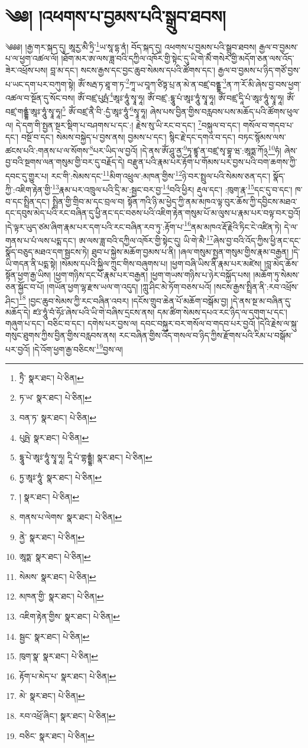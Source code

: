 \setcounter{footnote}{0} 
\chapter{༄༅། །འཕགས་པ་བྱམས་པའི་སྒྲུབ་ཐབས།}༄༅༅། །རྒྱ་གར་སྐད་དུ། ཨཱརྱ་མཻ་ཏྲི་\footnote{ཏྲཻ་  སྣར་ཐང་།  པེ་ཅིན། }ཡ་སཱ་དྷ་ནཾ། བོད་སྐད་དུ། འཕགས་པ་བྱམས་པའི་སྒྲུབ་ཐབས། རྒྱལ་བ་བྱམས་པ་ལ་ཕྱག་འཚལ་ལོ། །ཐོག་མར་ཨ་ལས་ཟླ་བའི་དཀྱིལ་འཁོར་གྱི་སྟེང་དུ་ཡི་གེ་མཻཾ་གསེར་གྱི་མདོག་ཅན་ལས་འོད་ཟེར་འཕྲོས་པས། བླ་མ་དང་། སངས་རྒྱས་དང་བྱང་ཆུབ་སེམས་དཔའི་ཚོགས་དང་། རྒྱལ་བ་བྱམས་པ་ཉིད་གཙོ་བྱས་པ་ཡང་དག་པར་བཀུག་སྟེ། ཨོཾ་སརྦ་ཏ་ཐཱ་ག་ཏ་\footnote{ཏ་ཡ་  སྣར་ཐང་།  པེ་ཅིན། }ཀཱ་ཡ་བཱཀ་ཙིཏྟ་པྲ་ན་མེ་ན་བཛྲ་བནྡྷ་\footnote{བན་ཏ་  སྣར་ཐང་།  པེ་ཅིན། }ན་ཀ་རོ་མི་ཞེས་བྱ་བས་ཕྱག་འཚལ་བ་སྔོན་དུ་སོང་བས། ཨོཾ་བཛྲ་པུཥྤཾ་\footnote{པུཥྤེ་  སྣར་ཐང་།  པེ་ཅིན། }ཨཱཿ་ཧཱུཾ་སྭཱ་ཧཱ། ཨོཾ་བཛྲ་:དྷཱུ་པཾ་ཨཱཿ་ཧཱུཾ་སྭཱ་ཧཱ། ཨོཾ་བཛྲ་དཱི་པཾ་ཨཱཿ་ཧཱུཾ་སྭཱ་ཧཱ། ཨོཾ་བཛྲ་གནྡྷཾ་ཨཱཿ་ཧཱུཾ་སྭཱ་ཧཱ།\footnote{དྷཱུ་པེ་ཨཱཿ་ཧཱུཾ་སྭཱ་ཧཱ། དཱི་པཾ་གྷནྡྷཾ།  སྣར་ཐང་།  པེ་ཅིན། } ཨོཾ་བཛྲ་ནཻ་བི་:དྱཾ་ཨཱཿ་ཧཱུཾ་\footnote{ཏྱ་ཨཱཿ་ཧཱུཾ་  སྣར་ཐང་།  པེ་ཅིན། }སྭཱ་ཧཱ། ཞེས་པས་བྱིན་གྱིས་བརླབས་པས་མཆོད་པའི་ཚོགས་ཕུལ་ལ། དེ་དག་གི་སྤྱན་སྔར་སྡིག་པ་བཤགས་པ་དང་:། རྗེས་སུ་ཡི་རང་བ་དང་། \footnote{།    སྣར་ཐང་།  པེ་ཅིན། }བསྐུལ་བ་དང་། གསོལ་བ་གདབ་པ་དང་། བསྔོ་བ་དང་། སེམས་བསྐྱེད་པ་བྱས་ནས། བྱམས་པ་དང་། སྙིང་རྗེ་དང་དགའ་བ་དང་། བཏང་སྙོམས་ལས་ཚངས་པའི་:གནས་པ་ལ་སོགས་\footnote{གནས་པ་ལེགས་  སྣར་ཐང་།  པེ་ཅིན། }པར་ཡིད་ལ་བྱའོ། །དེ་ནས་ཨོཾ་ཤཱུ་ནྱ་\footnote{ནྱེ་  སྣར་ཐང་།  པེ་ཅིན། }ཏཱ་ཛྙཱ་ན་བཛྲ་སྭ་བྷཱ་ཝ་:ཨཱཏྨ་ཀོ྅\footnote{ཨཱཏྨ་  སྣར་ཐང་།  པེ་ཅིན། }ཧཾ། ཞེས་བྱ་བའི་སྔགས་ལན་གསུམ་གྱི་བར་དུ་བརྗོད་དེ། བརྫུན་པའི་རྣམ་པར་རྟོག་པ་གོམས་པར་བྱས་པའི་བག་ཆགས་ཀྱི་དབང་དུ་གྱུར་པ། རང་གི་:སེམས་དང་\footnote{སེམས་  སྣར་ཐང་།  པེ་ཅིན། }མིག་འཕྲུལ་:མཁན་གྱིས་\footnote{མཁན་གྱི་  སྣར་ཐང་།  པེ་ཅིན། }ཉེ་བར་སྤྲུལ་པའི་སེམས་ཅན་དང་། སྣོད་ཀྱི་:འཇིག་རྟེན་གྱི་\footnote{འཇིག་རྟེན་གྱིས་  སྣར་ཐང་།  པེ་ཅིན། }རྣམ་པར་འཁྲུལ་པའི་དྲི་མ་:སྦྱང་བར་བྱ་\footnote{སྦྱང་  སྣར་ཐང་།  པེ་ཅིན། }བའི་ཕྱིར། རྡུལ་དང་། :ཁུག་རྣ་\footnote{ཁུག་སྣ་  སྣར་ཐང་།  པེ་ཅིན། }དང་དུ་བ་དང་། ཁ་བ་དང་སྤྲིན་དང་། སྤྲིན་གྱི་གྲིབ་མ་དང་བྲལ་བ། སྟོན་ཀའི་ཉི་མ་ཕྱེད་ཀྱི་ནམ་མཁའ་ལྟ་བུར་ཆོས་ཀྱི་དབྱིངས་མཐའ་དང་དབུས་མེད་པའི་རང་བཞིན་དུ་ཕྱི་ནང་དང་བཅས་པའི་འཇིག་རྟེན་གསུམ་པོ་མ་ལུས་པ་རྣམ་པར་བལྟ་བར་བྱའོ། །དེ་ལྟར་ཡུད་ཙམ་ཞིག་རྣམ་པར་དག་པའི་རང་བཞིན་རབ་ཏུ་:རྟོག་པ་\footnote{རྟོག་པ་མེད་པ་  སྣར་ཐང་།  པེ་ཅིན། }ནམ་མཁའ་རྡོ་རྗེའི་ཏིང་ངེ་འཛིན་ཏེ། དེ་ལ་གནས་པ་པཾ་ལས་པདྨ་དང་། ཨ་ལས་ཟླ་བའི་དཀྱིལ་འཁོར་གྱི་སྟེང་དུ། ཡི་གེ་མཻ་\footnote{མེ་  སྣར་ཐང་།  པེ་ཅིན། }ཞེས་བྱ་བའི་འོད་ཀྱིས་ཕྱི་ནང་དང་སྣོད་བཅུད་མཐའ་དག་སྦྱངས་ཏེ། ཐུབ་པ་སྐྱེས་མཆོག་བྱམས་པ་ནི། །ཞལ་གསུམ་སྤྱན་གསུམ་གྱིས་རྣམ་བརྒྱན། །དེ་ཡི་གདན་ནི་པདྨ་སྟེ། །སེམས་དཔའི་སྐྱིལ་ཀྲུང་གིས་བཞུགས་པ། །ཕྱག་བཞི་ཡིས་ནི་རྣམ་པར་མཛེས། །བླ་མེད་ཆོས་སྟོན་ཕྱག་རྒྱ་ཡིས། །ཕྱག་གཉིས་དང་པོ་རྣམ་པར་བརྒྱན། །ཕྱག་གཡས་གཉིས་པ་ཉེར་བསྐྱོད་པས། །མཆོག་ཏུ་སེམས་ཅན་སྐྱོང་བ་པོ། །གཡོན་ཕྱག་ལྷ་རྫས་ཡལ་ག་འདུད། །ཀླུ་ཤིང་མེ་ཏོག་བཅས་པའོ། །སངས་རྒྱས་སྤྲིན་ནི་:རབ་འཕྲོས་ཤིང་།\footnote{རབ་འཕྲོ་ཞིང་།  སྣར་ཐང་།  པེ་ཅིན། } །བྱང་ཆུབ་སེམས་ཀྱི་རང་བཞིན་འབར། །དངོས་གྲུབ་ཆེན་པོ་མཆོག་བསྒོམ་བྱ། །དེ་ནས་སྔ་མ་བཞིན་དུ་མཆོད་དེ། ཛཿ་ཧཱུཾ་བཾ་ཧོཿ་ཞེས་པའི་ཡི་གེ་བཞིས་དྲངས་ནས། དམ་ཚིག་སེམས་དཔའ་རང་ཉིད་ལ་དགུག་པ་དང་། གཞུག་པ་དང་། བཅིང་བ་དང་། དགེས་པར་བྱས་ལ། དབང་བསྐུར་བར་གསོལ་བ་གདབ་པར་བྱའོ། །དེའི་རྗེས་ལ་སྐུ་གསུང་ཐུགས་ཀྱིས་བྱིན་གྱིས་བརླབས་ནས། རང་བཞིན་གྱིས་འོད་གསལ་བ་ཉིད་ཀྱིས་རྫོགས་པའི་རིམ་པ་བསྒོམ་པར་བྱའོ། །དེ་འོག་ཕྱག་རྒྱ་བཅིངས་\footnote{བཅིང་  སྣར་ཐང་།  པེ་ཅིན། }བྱས་ལ། 